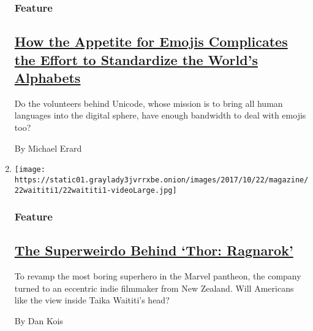 \begin{enumerate}
  \hypertarget{feature-2}{%
  \subsubsection{Feature}\label{feature-2}}

  \hypertarget{how-the-appetite-for-emojis-complicates-the-effort-to-standardize-the-worlds-alphabets}{%
  \subsection{\texorpdfstring{\href{/2017/10/18/magazine/how-the-appetite-for-emojis-complicates-the-effort-to-standardize-the-worlds-alphabets.html}{How
  the Appetite for Emojis Complicates the Effort to Standardize the
  World's
  Alphabets}}{How the Appetite for Emojis Complicates the Effort to Standardize the World's Alphabets}}\label{how-the-appetite-for-emojis-complicates-the-effort-to-standardize-the-worlds-alphabets}}

  Do the volunteers behind Unicode, whose mission is to bring all human
  languages into the digital sphere, have enough bandwidth to deal with
  emojis too?

  By Michael Erard
\item
  \texttt{[image: https://static01.graylady3jvrrxbe.onion/images/2017/10/22/magazine/22waititi1/22waititi1-videoLarge.jpg]}

  \hypertarget{feature-3}{%
  \subsubsection{Feature}\label{feature-3}}

  \hypertarget{the-superweirdo-behind-thor-ragnarok}{%
  \subsection{\texorpdfstring{\href{/2017/10/19/magazine/the-superweirdo-behind-thor-ragnarok.html}{The
  Superweirdo Behind `Thor:
  Ragnarok'}}{The Superweirdo Behind `Thor: Ragnarok'}}\label{the-superweirdo-behind-thor-ragnarok}}

  To revamp the most boring superhero in the Marvel pantheon, the
  company turned to an eccentric indie filmmaker from New Zealand. Will
  Americans like the view inside Taika Waititi's head?

  By Dan Kois
\end{enumerate}

